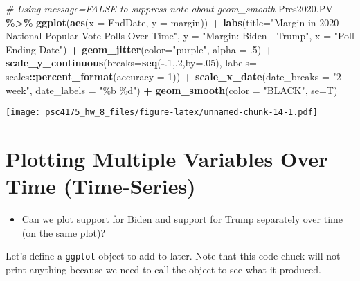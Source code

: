 \documentclass[
]{article}
\newenvironment{Shaded}{\begin{snugshade}}{\end{snugshade}}
\newcommand{\AttributeTok}[1]{\textcolor[rgb]{0.13,0.29,0.53}{#1}}
\newcommand{\CommentTok}[1]{\textcolor[rgb]{0.56,0.35,0.01}{\textit{#1}}}
\newcommand{\DecValTok}[1]{\textcolor[rgb]{0.00,0.00,0.81}{#1}}
\newcommand{\FunctionTok}[1]{\textcolor[rgb]{0.13,0.29,0.53}{\textbf{#1}}}
\newcommand{\NormalTok}[1]{#1}
\newcommand{\SpecialCharTok}[1]{\textcolor[rgb]{0.81,0.36,0.00}{\textbf{#1}}}
\newcommand{\StringTok}[1]{\textcolor[rgb]{0.31,0.60,0.02}{#1}}
\providecommand{\tightlist}{%
  \setlength{\itemsep}{0pt}\setlength{\parskip}{0pt}}
\begin{document}
\begin{Shaded}
\begin{Highlighting}[]
\CommentTok{\# Using message=FALSE to suppress note about geom\_smooth}
\NormalTok{Pres2020.PV }\SpecialCharTok{\%\textgreater{}\%}
  \FunctionTok{ggplot}\NormalTok{(}\FunctionTok{aes}\NormalTok{(}\AttributeTok{x =}\NormalTok{ EndDate, }\AttributeTok{y =}\NormalTok{ margin)) }\SpecialCharTok{+} 
  \FunctionTok{labs}\NormalTok{(}\AttributeTok{title=}\StringTok{"Margin in 2020 National Popular Vote Polls Over Time"}\NormalTok{,}
       \AttributeTok{y =} \StringTok{"Margin: Biden {-} Trump"}\NormalTok{,}
       \AttributeTok{x =} \StringTok{"Poll Ending Date"}\NormalTok{) }\SpecialCharTok{+} 
    \FunctionTok{geom\_jitter}\NormalTok{(}\AttributeTok{color=}\StringTok{"purple"}\NormalTok{, }\AttributeTok{alpha =}\NormalTok{ .}\DecValTok{5}\NormalTok{) }\SpecialCharTok{+} 
    \FunctionTok{scale\_y\_continuous}\NormalTok{(}\AttributeTok{breaks=}\FunctionTok{seq}\NormalTok{(}\SpecialCharTok{{-}}\NormalTok{.}\DecValTok{1}\NormalTok{,.}\DecValTok{2}\NormalTok{,}\AttributeTok{by=}\NormalTok{.}\DecValTok{05}\NormalTok{),}
                     \AttributeTok{labels=}\NormalTok{ scales}\SpecialCharTok{::}\FunctionTok{percent\_format}\NormalTok{(}\AttributeTok{accuracy =} \DecValTok{1}\NormalTok{)) }\SpecialCharTok{+}
    \FunctionTok{scale\_x\_date}\NormalTok{(}\AttributeTok{date\_breaks =} \StringTok{"2 week"}\NormalTok{, }\AttributeTok{date\_labels =} \StringTok{"\%b \%d"}\NormalTok{) }\SpecialCharTok{+}
    \FunctionTok{geom\_smooth}\NormalTok{(}\AttributeTok{color =} \StringTok{"BLACK"}\NormalTok{, }\AttributeTok{se=}\NormalTok{T) }
\end{Highlighting}
\end{Shaded}

\texttt{[image: psc4175\_hw\_8\_files/figure-latex/unnamed-chunk-14-1.pdf]}

\section{Plotting Multiple Variables Over Time
(Time-Series)}\label{plotting-multiple-variables-over-time-time-series}

\begin{itemize}
\tightlist
\item
  Can we plot support for Biden and support for Trump separately over
  time (on the same plot)?
\end{itemize}

Let's define a \texttt{ggplot} object to add to later. Note that this
code chuck will not print anything because we need to call the object to
see what it produced.
\end{document}
